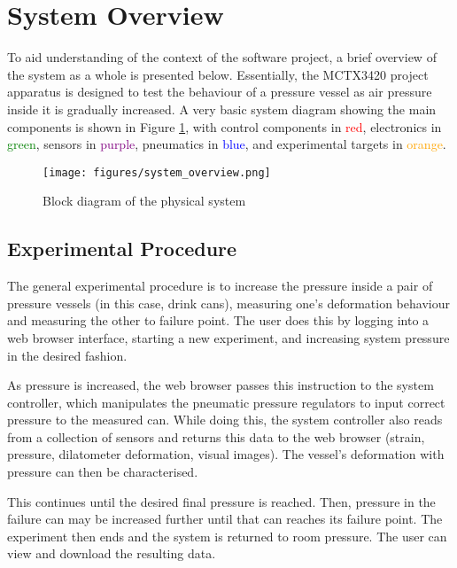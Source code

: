 \section{System Overview}

To aid understanding of the context of the software project, a brief overview of the system as a whole is presented below. Essentially, the MCTX3420 project apparatus is designed to test the behaviour of a pressure vessel as air pressure inside it is gradually increased. A very basic system diagram showing the main components is shown in Figure \ref{system_overview.png}, with control components in \textcolor{red}{ red}, electronics in \textcolor{green}{ green}, sensors in \textcolor{Purple}{ purple}, pneumatics in \textcolor{blue}{ blue}, and experimental targets in \textcolor{Orange}{ orange}.

\begin{figure}[H]
	\centering
	\texttt{[image: figures/system\_overview.png]}
	\caption{Block diagram of the physical system} 
	\label{system_overview.png}
\end{figure}

\subsection{Experimental Procedure}

The general experimental procedure is to increase the pressure inside a pair of pressure vessels (in this case, drink cans), measuring one's deformation behaviour and measuring the other to failure point. The user does this by logging into a web browser interface, starting a new experiment, and increasing system pressure in the desired fashion.

As pressure is increased, the web browser passes this instruction to the system controller, which manipulates the pneumatic pressure regulators to input correct pressure to the measured can. While doing this, the system controller also reads from a collection of sensors and returns this data to the web browser (strain, pressure, dilatometer deformation, visual images). The vessel's deformation with pressure can then be characterised.

This continues until the desired final pressure is reached. Then, pressure in the failure can may be increased further until that can reaches its failure point. The experiment then ends and the system is returned to room pressure. The user can view and download the resulting data.

